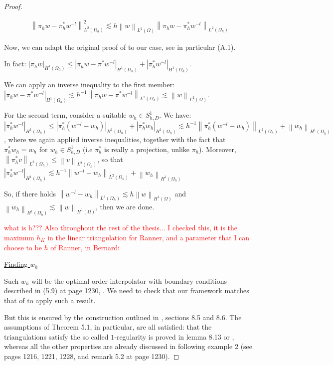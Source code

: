 \documentclass[english,a4paper,10pt,oneside]{scrbook}	%
\theoremstyle{break}
\newenvironment{mproof}[1][\proofname]{%
  \begin{proof}[#1]$ $\par\nobreak\ignorespaces
}{%
  \end{proof}
}
\renewcommand*{\proofname}{Proof}
\theoremstyle{remark}
\newcommand{\norm}[1]{\left\lVert#1\right\rVert}
\begin{document}
\begin{mproof}
\begin{align*}
	\norm{\pi_h w - \pi_h^* w^{-l}}^2_{L^2(\Omega_h)}\lesssim h \norm{w}_{L^2(\Omega)}\norm{\pi_h w - \pi_h^* w^{-l}}_{L^2(\Omega_h)}
\end{align*}

Now, we can adapt the original proof of \cite{bank} to our case, see in particular (A.1).

In fact: $|\pi_h w|_{H^1(\Omega_h)}\leq |\pi_h w -\pi^* w^{-l}|_{H^1(\Omega_h)} + |\pi_h^* w^{-l}|_{H^1(\Omega_h)}$.

We can apply an inverse inequality to the first member: $|\pi_h w -\pi^* w^{-l}|_{H^1(\Omega_h)}\lesssim h^{-1}\norm{\pi_h w -\pi^* w^{-l}}_{L^2(\Omega_h)}\lesssim \norm{w}_{L^2(\Omega)}$.

For the second term, consider a suitable $w_h \in S^{1}_{h,D}$. We have: $|\pi_h^* w^{-l}|_{H^1(\Omega_h)}\leq |\pi_h^* (w^{-l}-w_h)|_{H^1(\Omega_h)} +|\pi_h^* w_h|_{H^1(\Omega_h)}\lesssim h^{-1}\norm{\pi_h^*(w^{-l}-w_h)}_{L^2(\Omega_h)} +\norm{w_h}_{H^1(\Omega_h)}$, where we again applied inverse inequalities, together with the fact that $\pi_h^* w_h = w_h$ for $w_h \in S^1_{h,D}$ (i.e $\pi_h^*$ is really a projection, unlike $\pi_h$). Moreover, $\norm{\pi_h^* v}_{L^2(\Omega_h)}\leq \norm{v}_{L^2(\Omega_h)}$, so that $|\pi_h^* w^{-l}|_{H^1(\Omega_h)} \lesssim h^{-1}\norm{w^{-l}-w_h}_{L^2(\Omega_h)} +\norm{w_h}_{H^1(\Omega_h)}$

So, if there holds $\norm{w^{-l}-w_h}_{L^2(\Omega_h)}\lesssim h \norm{w}_{H^1(\Omega)}$ and $\norm{w_h}_{H^1(\Omega_h)}\lesssim \norm{w}_{H^1(\Omega)}$, then we are done.

\textcolor{red}{what is h??? Also throughout the rest of the thesis... I checked this, it is the maximum $h_K$ in the linear triangulation for Ranner, and a parameter that I can choose to be $h$ of Ranner, in Bernardi}

\underline{Finding $w_h$}

Such $w_h$ will be the optimal order interpolator with boundary conditions described in (5.9) at page 1230, \cite{bernardi}. We need to check that our framework matches that of \cite{bernardi} to apply such a result.

But this is ensured by the construction outlined in \cite{ranner}, sections 8.5 and 8.6. The assumptions of Theorem 5.1, in particular, are all satisfied: that the triangulations satisfy the so called $1$-regularity is proved in lemma 8.13 or \cite{ranner}, whereas all the other properties are already discussed in \cite{bernardi} following example 2 (see pages 1216, 1221, 1228, and remark 5.2 at page 1230).


\end{mproof}
\end{document}
